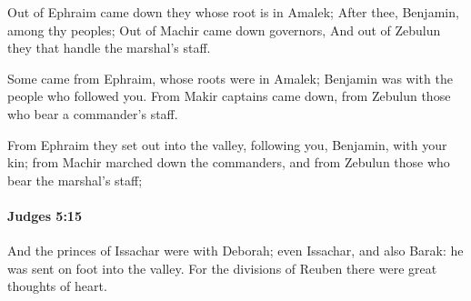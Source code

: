 			\begin{versebox}
					\item[BHS] 
					\item[ASV] Out of Ephraim came down they whose root is in Amalek; After thee, Benjamin, among thy peoples; Out of Machir came down governors, And out of Zebulun they that handle the marshal's staff.
					\item[NIV] Some came from Ephraim, whose roots were in Amalek; Benjamin was with the people who followed you. From Makir captains came down, from Zebulun those who bear a commander’s staff.
					\item[NRSV] From Ephraim they set out into the valley, following you, Benjamin, with your kin; from Machir marched down the commanders, and from Zebulun those who bear the marshal’s staff;
			\end{versebox}

		\paragraph{Judges 5:15} %
			\label{JUDGES-5-15}

			And the princes of Issachar were with Deborah; even Issachar, and also Barak: he was sent on foot into the valley. For the divisions of Reuben there were great thoughts of heart.

